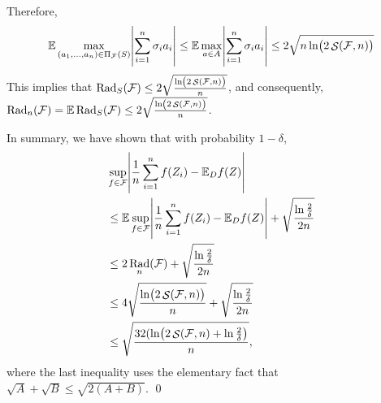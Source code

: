 \documentclass{article}
\DeclareMathOperator{\Rad}{{\mathrm{Rad}}}
\DeclareMathOperator*{\Scal}{{\cal S}}
\newcommand{\EE}{\mathbb{E}}
\newcommand{\Fcal}{\mathcal{F}}
\begin{document}
Therefore,
\begin{eqnarray*}
  \EE \max_{(a_1,\ldots,a_n) \in \Pi_\Fcal(S)} \abs{\sum_{i=1}^n \sigma_i a_i}
  \leq \EE \max_{a \in A} \abs{\sum_{i=1}^n \sigma_i a_i}
  \leq 2 \sqrt{n \ln(2\Scal(\Fcal, n))}
\end{eqnarray*}
This implies that $\Rad_S(\Fcal) \leq 2 \sqrt{\frac{\ln(2\Scal(\Fcal, n))}{n}}$,
and consequently, $\Rad_n(\Fcal) = \EE \Rad_S(\Fcal) \leq 2 \sqrt{\frac{\ln(2\Scal(\Fcal, n))}{n}}$.

In summary, we have shown that with probability $1-\delta$,
\begin{align*}
& \sup_{f \in \Fcal} \abs{\frac{1}{n} \sum_{i=1}^n f(Z_i) - \EE_D f(Z)} \\
& \leq \EE \sup_{f \in \Fcal} \abs{\frac{1}{n} \sum_{i=1}^n f(Z_i) - \EE_D f(Z)} + \sqrt{\frac{\ln\frac{2}{\delta}}{2n}} \\
& \leq 2\Rad_n(\Fcal) + \sqrt{\frac{\ln\frac{2}{\delta}}{2n}} \\
& \leq 4 \sqrt{\frac{\ln(2\Scal(\Fcal, n))}{n}} + \sqrt{\frac{\ln\frac{2}{\delta}}{2n}} \\
& \leq \sqrt{\frac{32(\ln(2\Scal(\Fcal, n) + \ln\frac{2}{\delta})}{n}},
\end{align*}
where the last inequality uses the elementary fact that $\sqrt{A} + \sqrt{B} \leq \sqrt{2(A+B)}$. \qed

\end{document}
